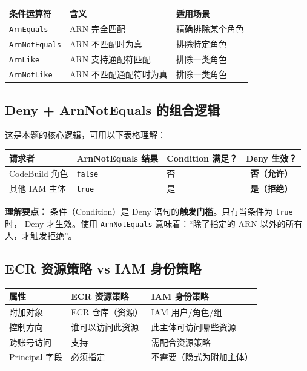 \documentclass[12pt, a4paper]{article}
\begin{document}
\begin{center}
\begin{tabular}{lll}
  \toprule
  \textbf{条件运算符} & \textbf{含义} & \textbf{适用场景} \\
  \midrule
  \texttt{ArnEquals} & ARN 完全匹配 & 精确排除某个角色 \\
  \texttt{ArnNotEquals} & ARN 不匹配时为真 & 排除特定角色 \\
  \texttt{ArnLike} & ARN 支持通配符匹配 & 排除一类角色 \\
  \texttt{ArnNotLike} & ARN 不匹配通配符时为真 & 排除一类角色 \\
  \bottomrule
\end{tabular}
\end{center}

\subsection{Deny + ArnNotEquals 的组合逻辑}

这是本题的核心逻辑，可用以下表格理解：

\begin{center}
\begin{tabular}{lllc}
  \toprule
  \textbf{请求者} & \textbf{ArnNotEquals 结果} & \textbf{Condition 满足？} & \textbf{Deny 生效？} \\
  \midrule
  CodeBuild 角色 & \texttt{false} & 否 & \textcolor{successgreen}{\textbf{否（允许）}} \\
  其他 IAM 主体 & \texttt{true} & 是 & \textcolor{alertred}{\textbf{是（拒绝）}} \\
  \bottomrule
\end{tabular}
\end{center}

\begin{infobox}
  \textbf{理解要点：} 条件（Condition）是 Deny 语句的\textbf{触发门槛}。只有当条件为 \texttt{true} 时，
  Deny 才生效。使用 \texttt{ArnNotEquals} 意味着：``除了指定的 ARN 以外的所有人，才触发拒绝''。
\end{infobox}

\subsection{ECR 资源策略 vs IAM 身份策略}

\begin{center}
\begin{tabular}{lll}
  \toprule
  \textbf{属性} & \textbf{ECR 资源策略} & \textbf{IAM 身份策略} \\
  \midrule
  附加对象 & ECR 仓库（资源） & IAM 用户/角色/组 \\
  控制方向 & 谁可以访问此资源 & 此主体可访问哪些资源 \\
  跨账号访问 & 支持 & 需配合资源策略 \\
  Principal 字段 & 必须指定 & 不需要（隐式为附加主体）\\
  \bottomrule
\end{tabular}
\end{center}
\end{document}

